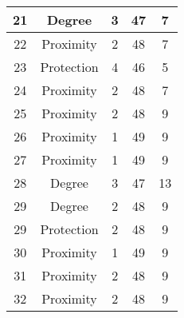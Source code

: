 \documentclass[results.tex]{subfiles}
\begin{document}
\begin{center}
\begin{tabular}{| c || c | c | c | c |}
            \hline
            21                      & Degree                       & 3                      & 47                      & 7                    \\
            \hline
            22                      & Proximity                    & 2                      & 48                      & 7                    \\
            \hline
            23                      & Protection                   & 4                      & 46                      & 5                    \\
            \hline
            24                      & Proximity                    & 2                      & 48                      & 7                    \\
            \hline
            25                      & Proximity                    & 2                      & 48                      & 9                    \\
            \hline
            26                      & Proximity                    & 1                      & 49                      & 9                    \\
            \hline
            27                      & Proximity                    & 1                      & 49                      & 9                    \\
            \hline
            28                      & Degree                       & 3                      & 47                      & 13                   \\
            \hline
            29                      & Degree                       & 2                      & 48                      & 9                    \\
            \hline
            29                      & Protection                   & 2                      & 48                      & 9                    \\
            \hline
            30                      & Proximity                    & 1                      & 49                      & 9                    \\
            \hline
            31                      & Proximity                    & 2                      & 48                      & 9                    \\
            \hline
            32                      & Proximity                    & 2                      & 48                      & 9                    \\

\end{tabular}
\end{center}
\end{document}
